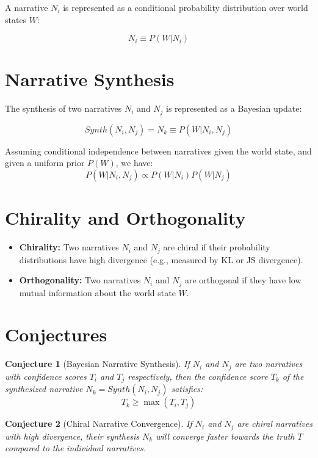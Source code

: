 \documentclass[12pt, a4paper]{article}
\newtheorem{conjecture}{Conjecture}
\begin{document}
A narrative $N_i$ is represented as a conditional probability distribution over world states $W$:

\[
N_i \equiv P(W|N_i)
\]

\section{Narrative Synthesis}

The synthesis of two narratives $N_i$ and $N_j$ is represented as a Bayesian update:

\[
Synth(N_i, N_j) = N_k \equiv P(W|N_i, N_j)
\]

Assuming conditional independence between narratives given the world state, and given a uniform prior $P(W)$, we have:
\[P(W|N_i, N_j) \propto P(W|N_i) P(W|N_j) \]


\section{Chirality and Orthogonality}

\begin{itemize}
    \item \textbf{Chirality:}  Two narratives $N_i$ and $N_j$ are chiral if their probability distributions have high divergence (e.g., measured by KL or JS divergence).
    \item \textbf{Orthogonality:} Two narratives $N_i$ and $N_j$ are orthogonal if they have low mutual information about the world state $W$.
\end{itemize}

\section{Conjectures}

\begin{conjecture}[Bayesian Narrative Synthesis]
If $N_i$ and $N_j$ are two narratives with confidence scores $T_i$ and $T_j$ respectively, then the confidence score $T_k$ of the synthesized narrative $N_k = Synth(N_i, N_j)$ satisfies:
\[
T_k \ge \max(T_i, T_j)
\]
\end{conjecture}

\begin{conjecture}[Chiral Narrative Convergence]
If $N_i$ and $N_j$ are chiral narratives with high divergence, their synthesis $N_k$ will converge faster towards the truth $T$ compared to the individual narratives.
\end{conjecture}
\end{document}
